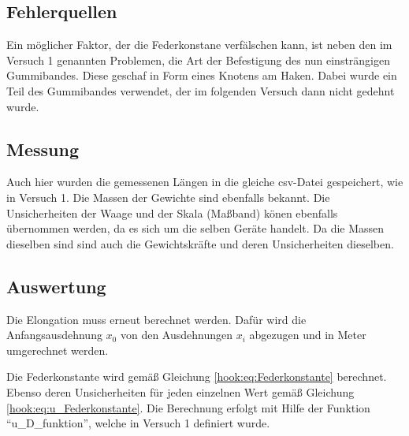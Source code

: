 \documentclass[
  9pt,
]{article}
\begin{document}
\hypertarget{fehlerquellen-1}{%
\subsection{Fehlerquellen}\label{fehlerquellen-1}}

Ein möglicher Faktor, der die Federkonstane verfälschen kann, ist neben
den im Versuch 1 genannten Problemen, die Art der Befestigung des nun
einsträngigen Gummibandes. Diese geschaf in Form eines Knotens am Haken.
Dabei wurde ein Teil des Gummibandes verwendet, der im folgenden Versuch
dann nicht gedehnt wurde.

\hypertarget{messung-1}{%
\subsection{Messung}\label{messung-1}}

Auch hier wurden die gemessenen Längen in die gleiche csv-Datei
gespeichert, wie in Versuch 1. Die Massen der Gewichte sind ebenfalls
bekannt. Die Unsicherheiten der Waage und der Skala (Maßband) könen
ebenfalls übernommen werden, da es sich um die selben Geräte handelt. Da
die Massen dieselben sind sind auch die Gewichtskräfte und deren
Unsicherheiten dieselben.

\hypertarget{auswertung}{%
\subsection{Auswertung}\label{auswertung}}

Die Elongation muss erneut berechnet werden. Dafür wird die
Anfangsausdehnung \(x_0\) von den Ausdehnungen \(x_i\) abgezugen und in
Meter umgerechnet werden.

Die Federkonstante wird gemäß Gleichung \ref{hook:eq:Federkonstante}
berechnet. Ebenso deren Unsicherheiten für jeden einzelnen Wert gemäß
Gleichung \ref{hook:eq:u_Federkonstante}. Die Berechnung erfolgt mit
Hilfe der Funktion ``u\_D\_funktion'', welche in Versuch 1 definiert
wurde.
\end{document}
